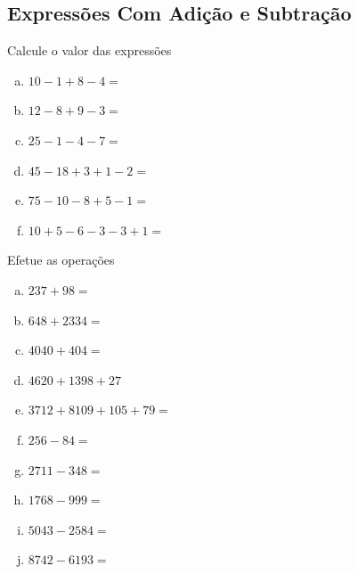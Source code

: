 \subsection{Expressões Com Adição e Subtração}

	\item Calcule o valor das expressões
	\begin{multicols}{2}
	\begin{enumerate}[a)]
		\item $10-1+8-4=$
		\item $12-8+9-3=$
		\item $25-1-4-7=$
		\item $ 45-18+3+1-2=$
		\item $75-10-8+5-1=$
		\item $10+5-6-3-3+1=$
	\end{enumerate}
	\end{multicols}
	\item Efetue as operações
	\begin{multicols}{2}
	\begin{enumerate}[a)]
		\item $ 237+98 =$
		\item $648+2334 =$
		\item $4040+404 =$
		\item $4620+1398+27$
		\item $3712+8109+105+79 =$
		\item $256-84 =$
		\item $2711-348 =$
		\item $1768-999 =$
		\item $5043-2584 =$
		\item $ 8742-6193 =$
	\end{enumerate}
	\end{multicols}

